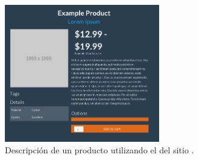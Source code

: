 \begin{figure}[H]
	\centering
	\includegraphics[width=0.6\textwidth]{figuras/bootstrap/bootstrap_theme_superhero.png}

	\caption{Descripción de un producto utilizando el \themeCPT \textbf{\themeSuperHero} del sitio \bootswatchNAME.}
	\label{figure:bootstrap:theme_superhero}
\end{figure}

\subsubsection{\eframeworkCorePCKG}

